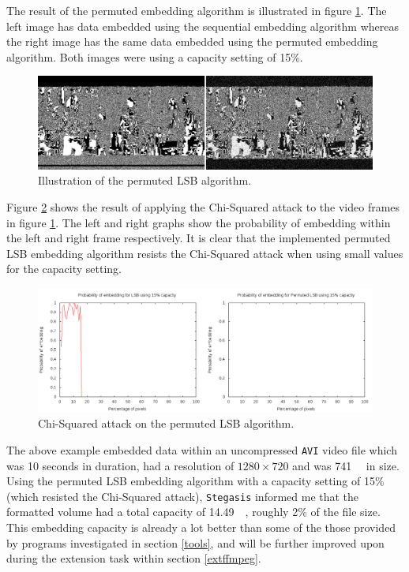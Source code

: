 \documentclass[paper=a4, fontsize=11pt,twoside]{scrartcl}    %
\numberwithin{table}{section}
\numberwithin{figure}{section}
\numberwithin{algorithm}{section}
\begin{document}
The result of the permuted embedding algorithm is illustrated in figure \ref{lsbp_ill}. The left image has data embedded using the sequential embedding algorithm whereas the right image has the same data embedded using the permuted embedding algorithm. Both images were using a capacity setting of 15\%.

\begin{figure}[here]
\centerline{\includegraphics[width=\textwidth]{images/lsbp_ill.png}}
\caption{Illustration of the permuted LSB algorithm.}
\label{lsbp_ill}
\end{figure}

Figure \ref{lsbp_chi} shows the result of applying the Chi-Squared attack to the video frames in figure \ref{lsbp_ill}. The left and right graphs show the probability of embedding within the left and right frame respectively. It is clear that the implemented permuted LSB embedding algorithm resists the Chi-Squared attack when using small values for the capacity setting. 

\begin{figure}[here]
\centerline{\includegraphics[width=\textwidth]{images/lsbp_chi.png}}
\caption{Chi-Squared attack on the permuted LSB algorithm.}
\label{lsbp_chi}
\end{figure}

\noindent
The above example embedded data within an uncompressed \texttt{AVI} video file which was 10 seconds in duration, had a resolution of $1280\times720$ and was \SI{741}{\mega\byte} in size. Using the permuted LSB embedding algorithm with a capacity setting of 15\% (which resisted the Chi-Squared attack), \texttt{Stegasis} informed me that the formatted volume had a total capacity of \SI{14.49}{\mega\byte}, roughly 2\% of the file size. This embedding capacity is already a lot better than some of the those provided by programs investigated in section \ref{tools}, and will be further improved upon during the extension task within section \ref{extffmpeg}.
\end{document}
